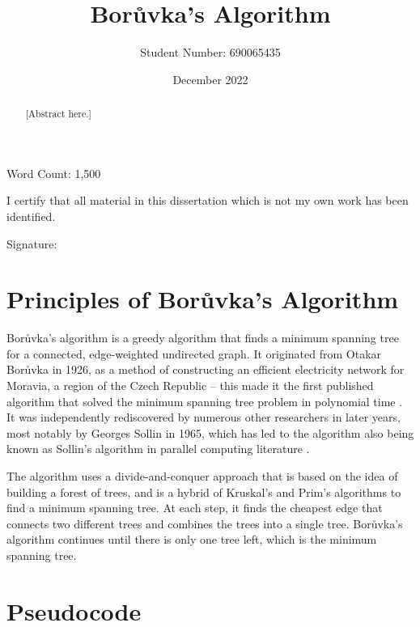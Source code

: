 \documentclass[a4paper, 11pt]{article}
\begin{document}
\title{Borůvka's Algorithm}
\author{Student Number: 690065435}
\date{December 2022}

\maketitle

\begin{abstract}
[Abstract here.]
\end{abstract}



\vspace*{\fill}
\begin{center}
Word Count: 1,500

\vspace{1em}
I certify that all material in this dissertation which is not my own work has been identified.
\end{center}
\vspace{1em}

Signature: \hrulefill

\newpage
\section{Principles of Borůvka's Algorithm}
Borůvka's algorithm is a greedy algorithm that finds a minimum spanning tree for a connected, edge-weighted undirected graph. It originated from Otakar Borůvka in 1926, as a method of constructing an efficient electricity network for Moravia, a region of the Czech Republic \cite{nevsetvril2001otakar} -- this made it the first published algorithm that solved the minimum spanning tree problem in polynomial time \cite{deterministicMSTs}. It was independently rediscovered by numerous other researchers in later years, most notably by Georges Sollin in 1965, which has led to the algorithm also being known as Sollin's algorithm in parallel computing literature \cite{sollin1965trace}. 

The algorithm uses a divide-and-conquer approach that is based on the idea of building a forest of trees, and is a hybrid of Kruskal's and Prim's algorithms to find a minimum spanning tree. At each step, it finds the cheapest edge that connects two different trees and combines the trees into a single tree. Borůvka's algorithm continues until there is only one tree left, which is the minimum spanning tree.

\section{Pseudocode}
\end{document}
